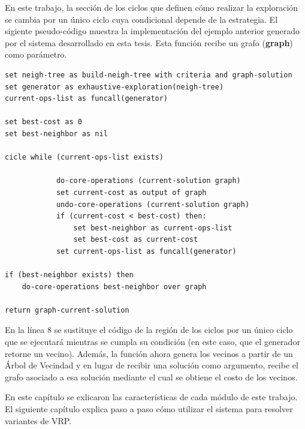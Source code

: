 En este trabajo, la sección de los ciclos que definen cómo realizar la exploración se cambia por un único ciclo cuya condicional depende de la estrategia. El sigiente pseudo-código muestra la implementación del ejemplo anterior generado por el sistema desarrollado en esta tesis. Esta función recibe un grafo (\textbf{graph}) como parámetro.

\begin{lstlisting}
set neigh-tree as build-neigh-tree with criteria and graph-solution
set generator as exhaustive-exploration(neigh-tree)
current-ops-list as funcall(generator)

set best-cost as 0
set best-neighbor as nil

cicle while (current-ops-list exists)
			
			do-core-operations (current-solution graph)
			set current-cost as output of graph
			undo-core-operations (current-solution graph)
			if (current-cost < best-cost) then:
				set best-neighbor as current-ops-list
				set best-cost as current-cost
			set current-ops-list as funcall(generator)

if (best-neighbor exists) then
	do-core-operations best-neighbor over graph

return graph-current-solution
\end{lstlisting}

En la línea 8 se sustituye el código de la región de los ciclos por un único ciclo que se ejecutará mientras se cumpla su condición (en este caso, que el generador retorne un vecino). Además, la función ahora genera los vecinos a partir de un Árbol de Vecindad y en lugar de recibir una solución como argumento, recibe el grafo asociado a esa solución mediante el cual se obtiene el costo de los vecinos.

En este capítulo se exlicaron las características de cada módulo de este trabajo. El siguiente capítulo explica paso a paso cómo utilizar el sistema para resolver variantes de VRP. 










